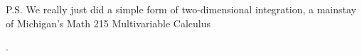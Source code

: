 P.S. We really just did a simple form of two-dimensional integration, a mainstay of Michigan's Math 215 Multivariable Calculus 
    
    
    
    
    
    
    
       
       
       
       
       
       
       
       
       
       
       
       
       
       
     . 




\clearpage

\begin{figure}[hbt]%
\centering
{}%
\newline
\centering
{}
\hfill
\subfloat[]{%
}
\end{figure}
